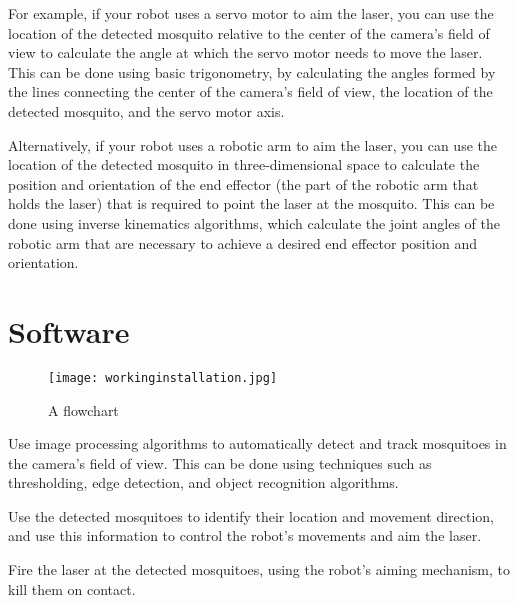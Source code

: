\documentclass[11pt]{article}
\begin{document}
 	For example, if your robot uses a servo motor to aim the laser, you can use the location of the detected mosquito relative to the center of the camera's field of view to calculate the angle at which the servo motor needs to move the laser. This can be done using basic trigonometry, by calculating the angles formed by the lines connecting the center of the camera's field of view, the location of the detected mosquito, and the servo motor axis.
 	
 	Alternatively, if your robot uses a robotic arm to aim the laser, you can use the location of the detected mosquito in three-dimensional space to calculate the position and orientation of the end effector (the part of the robotic arm that holds the laser) that is required to point the laser at the mosquito. This can be done using inverse kinematics algorithms, which calculate the joint angles of the robotic arm that are necessary to achieve a desired end effector position and orientation.
 	


 	
 
 	
 	
 	
 	







 
 \section{Software}
 
 \begin{center}
 	
 	
 	\begin{figure}[H]
 		\centering
 		\texttt{[image: workinginstallation.jpg]}
 		\caption{A flowchart  }
 		\label{fig:Flowchart}
 	\end{figure}
 \end{center}
 

Use image processing algorithms to automatically detect and track mosquitoes in the camera's field of view. This can be done using techniques such as thresholding, edge detection, and object recognition algorithms.

Use the detected mosquitoes to identify their location and movement direction, and use this information to control the robot's movements and aim the laser.

Fire the laser at the detected mosquitoes, using the robot's aiming mechanism, to kill them on contact.
\end{document}

